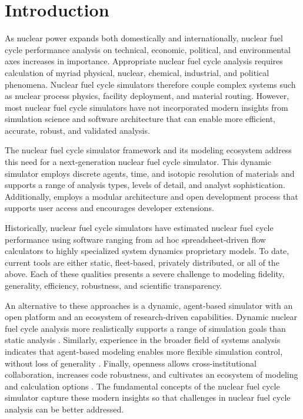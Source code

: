 
\section{Introduction}



As nuclear power expands both domestically and internationally, nuclear fuel cycle
performance analysis on technical, economic, political, and environmental axes increases 
in importance. Appropriate nuclear fuel cycle analysis requires calculation of myriad physical, nuclear, 
chemical, industrial, and political phenomena. Nuclear fuel cycle simulators 
therefore couple complex systems such as nuclear process physics, 
facility deployment, and material routing. However, most nuclear fuel cycle 
simulators have not incorporated modern insights from simulation science and 
software architecture that can enable more efficient, accurate, robust, and 
validated analysis. 

The \Cyclus nuclear fuel cycle simulator framework and 
its modeling ecosystem address this need for a next-generation nuclear fuel cycle 
simulator. This dynamic simulator employs discrete agents, time, and isotopic resolution of materials 
and supports a range of analysis types, levels of 
detail, and analyst sophistication.
Additionally, \Cyclus employs a modular architecture and 
open development process that supports user access and 
encourages developer extensions.

Historically, nuclear fuel cycle simulators have estimated 
nuclear fuel cycle performance using software 
ranging from ad hoc spreadsheet-driven flow calculators to highly specialized 
system dynamics
proprietary models. To date, current tools are either static, fleet-based, 
privately distributed, or all of the above. Each of these qualities presents a 
severe challenge to modeling fidelity, generality, efficiency, robustness, and 
scientific transparency. 

An alternative to these approaches is a dynamic, agent-based simulator with an 
open platform and an ecosystem of research-driven capabilities.  
Dynamic nuclear fuel cycle analysis more realistically 
supports a range of simulation goals than static analysis 
\cite{piet_dynamic_2011}. Similarly, experience in the broader field of systems 
analysis indicates that agent-based modeling enables more flexible simulation 
control, without loss of generality \cite{macal_agent-based_2010}. Finally, openness 
allows cross-institutional collaboration, increases code robustness, and 
cultivates an ecosystem of modeling and calculation options 
\cite{softwarecarpentryresource}.  The fundamental concepts of the \Cyclus 
nuclear fuel cycle simulator capture these modern insights so that challenges 
in nuclear fuel cycle analysis can be better addressed. 


